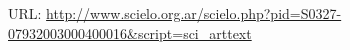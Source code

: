 \documentclass[a4paper,12pt]{article}
\newcommand{\doi}[1]{DOI: \href{http://dx.doi.org/#1}{#1}}
\begin{document}
\thispagestyle{empty}

\vspace{3cm}

\nocite{RM-art-2}
\printbibliography


\vspace{1.5cm}
URL: \url{http://www.scielo.org.ar/scielo.php?pid=S0327-07932003000400016&script=sci_arttext}




\newpage

\end{document}
